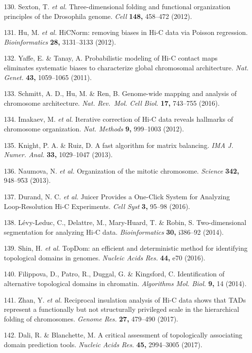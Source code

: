 \documentclass[11pt,twoside]{MPIthesis}
\theoremstyle{definition}
\theoremstyle{definition}
\theoremstyle{definition}
\theoremstyle{remark}
\begin{document}
130. Sexton, T. \emph{et al.} Three-dimensional folding and functional
organization principles of the Drosophila genome. \emph{Cell}
\textbf{148,} 458--472 (2012).

131. Hu, M. \emph{et al.} HiCNorm: removing biases in Hi-C data via
Poisson regression. \emph{Bioinformatics} \textbf{28,} 3131--3133
(2012).

132. Yaffe, E. \& Tanay, A. Probabilistic modeling of Hi-C contact maps
eliminates systematic biases to characterize global chromosomal
architecture. \emph{Nat. Genet.} \textbf{43,} 1059--1065 (2011).

133. Schmitt, A. D., Hu, M. \& Ren, B. Genome-wide mapping and analysis
of chromosome architecture. \emph{Nat. Rev.~Mol. Cell Biol.}
\textbf{17,} 743--755 (2016).

134. Imakaev, M. \emph{et al.} Iterative correction of Hi-C data reveals
hallmarks of chromosome organization. \emph{Nat. Methods} \textbf{9,}
999--1003 (2012).

135. Knight, P. A. \& Ruiz, D. A fast algorithm for matrix balancing.
\emph{IMA J. Numer. Anal.} \textbf{33,} 1029--1047 (2013).

136. Naumova, N. \emph{et al.} Organization of the mitotic chromosome.
\emph{Science} \textbf{342,} 948--953 (2013).

137. Durand, N. C. \emph{et al.} Juicer Provides a One-Click System for
Analyzing Loop-Resolution Hi-C Experiments. \emph{Cell Syst} \textbf{3,}
95--98 (2016).

138. Lévy-Leduc, C., Delattre, M., Mary-Huard, T. \& Robin, S.
Two-dimensional segmentation for analyzing Hi-C data.
\emph{Bioinformatics} \textbf{30,} i386--92 (2014).

139. Shin, H. \emph{et al.} TopDom: an efficient and deterministic
method for identifying topological domains in genomes. \emph{Nucleic
Acids Res.} \textbf{44,} e70 (2016).

140. Filippova, D., Patro, R., Duggal, G. \& Kingsford, C.
Identification of alternative topological domains in chromatin.
\emph{Algorithms Mol. Biol.} \textbf{9,} 14 (2014).

141. Zhan, Y. \emph{et al.} Reciprocal insulation analysis of Hi-C data
shows that TADs represent a functionally but not structurally privileged
scale in the hierarchical folding of chromosomes. \emph{Genome Res.}
\textbf{27,} 479--490 (2017).

142. Dali, R. \& Blanchette, M. A critical assessment of topologically
associating domain prediction tools. \emph{Nucleic Acids Res.}
\textbf{45,} 2994--3005 (2017).
\end{document}
